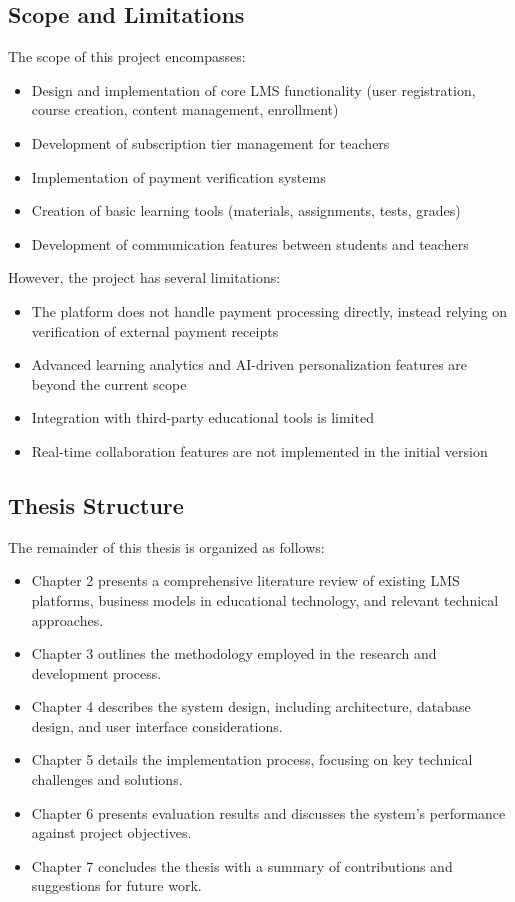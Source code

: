 \subsection{Scope and Limitations}

The scope of this project encompasses:

\begin{itemize}
    \item Design and implementation of core LMS functionality (user registration, course creation, content management, enrollment)
    \item Development of subscription tier management for teachers
    \item Implementation of payment verification systems
    \item Creation of basic learning tools (materials, assignments, tests, grades)
    \item Development of communication features between students and teachers
\end{itemize}

However, the project has several limitations:

\begin{itemize}
    \item The platform does not handle payment processing directly, instead relying on verification of external payment receipts
    \item Advanced learning analytics and AI-driven personalization features are beyond the current scope
    \item Integration with third-party educational tools is limited
    \item Real-time collaboration features are not implemented in the initial version
\end{itemize}

\subsection{Thesis Structure}

The remainder of this thesis is organized as follows:

\begin{itemize}
    \item Chapter 2 presents a comprehensive literature review of existing LMS platforms, business models in educational technology, and relevant technical approaches.
    \item Chapter 3 outlines the methodology employed in the research and development process.
    \item Chapter 4 describes the system design, including architecture, database design, and user interface considerations.
    \item Chapter 5 details the implementation process, focusing on key technical challenges and solutions.
    \item Chapter 6 presents evaluation results and discusses the system's performance against project objectives.
    \item Chapter 7 concludes the thesis with a summary of contributions and suggestions for future work.
\end{itemize}
